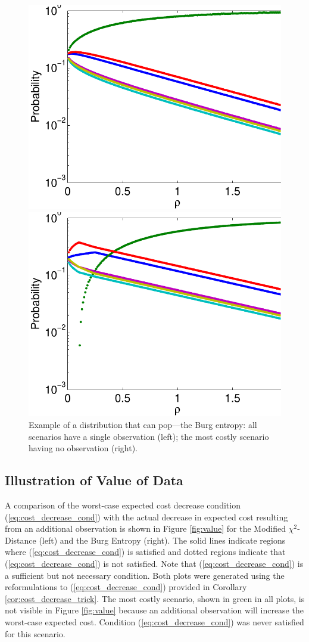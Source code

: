 \documentclass[12pt]{article}
\theoremstyle{plain}
\theoremstyle{definition}
\theoremstyle{remark}
\begin{document}
\begin{figure}[h]
	\FIGURE
	{%
		\includegraphics*[width=.42\textwidth]{images/burg}%
		\includegraphics*[width=.42\textwidth]{images/burg_zero}%
	}
	{
		Example of a distribution that can pop---the Burg entropy: 
		all scenarios have a single observation (left); 
		 the most costly scenario having no observation (right).
		\label{fig:pop}
	}
	{}
\end{figure}

\subsection{Illustration of Value of Data}
\label{ssec:numerical_value_of_data}

A comparison of the worst-case expected cost decrease condition (\ref{eq:cost_decrease_cond}) with the actual decrease in expected cost resulting from an additional observation is shown in Figure \ref{fig:value} for the Modified $\chi^2$-Distance (left) and the Burg Entropy (right).
The solid lines indicate regions where (\ref{eq:cost_decrease_cond}) is satisfied and dotted regions indicate that (\ref{eq:cost_decrease_cond}) is not satisfied.
Note that (\ref{eq:cost_decrease_cond}) is a sufficient but not necessary condition.
Both plots were generated using the reformulations to (\ref{eq:cost_decrease_cond}) provided in Corollary \ref{cor:cost_decrease_trick}.
The most costly scenario, shown in green in all plots, is not visible in Figure \ref{fig:value} because an additional observation will increase the worst-case expected cost.
Condition (\ref{eq:cost_decrease_cond}) was never satisfied for this scenario.
\end{document}
